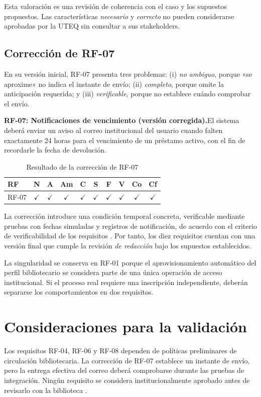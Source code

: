 \documentclass[conference,onecolumn]{IEEEtran}
\newcommand{\si}{\ensuremath{\checkmark}}
\newcommand{\req}[1]{\par\noindent\textbf{#1.}\hspace{0.5em}}
\begin{document}
Esta valoración es una revisión de coherencia con el caso y los supuestos propuestos. Las características \emph{necesario} y \emph{correcto} no pueden considerarse aprobadas por la UTEQ sin consultar a sus stakeholders.

\subsection{Corrección de RF-07}
En su versión inicial, RF-07 presenta tres problemas: (i) \emph{no ambiguo}, porque «se aproxime» no indica el instante de envío; (ii) \emph{completo}, porque omite la anticipación requerida; y (iii) \emph{verificable}, porque no establece cuándo comprobar el envío.

\req{RF-07: Notificaciones de vencimiento (versión corregida)}El sistema deberá enviar un aviso al correo institucional del usuario cuando falten exactamente 24 horas para el vencimiento de un préstamo activo, con el fin de recordarle la fecha de devolución.

\begin{table}[H]
\caption{Resultado de la corrección de RF-07}
\label{tab:correccion}
\centering\scriptsize
\setlength{\tabcolsep}{3.6pt}
\begin{tabular}{@{}l*{9}{c}@{}}
\toprule
\textbf{RF} & \textbf{N} & \textbf{A} & \textbf{Am} & \textbf{C} & \textbf{S} & \textbf{F} & \textbf{V} & \textbf{Co} & \textbf{Cf}\\
\midrule
RF-07 & \si & \si & \si & \si & \si & \si & \si & \si & \si\\
\bottomrule
\end{tabular}
\end{table}

La corrección introduce una condición temporal concreta, verificable mediante pruebas con fechas simuladas y registros de notificación, de acuerdo con el criterio de verificabilidad de los requisitos \cite{ieee29148}. Por tanto, los diez requisitos cuentan con una versión final que cumple la revisión \emph{de redacción} bajo los supuestos establecidos.

La singularidad se conserva en RF-01 porque el aprovisionamiento automático del perfil bibliotecario se considera parte de una única operación de acceso institucional. Si el proceso real requiere una inscripción independiente, deberán separarse los comportamientos en dos requisitos.

\section{Consideraciones para la validación}
Los requisitos RF-04, RF-06 y RF-08 dependen de políticas preliminares de circulación bibliotecaria. La corrección de RF-07 establece un instante de envío, pero la entrega efectiva del correo deberá comprobarse durante las pruebas de integración. Ningún requisito se considera institucionalmente aprobado antes de revisarlo con la biblioteca \cite{ieee29148}.
\end{document}
